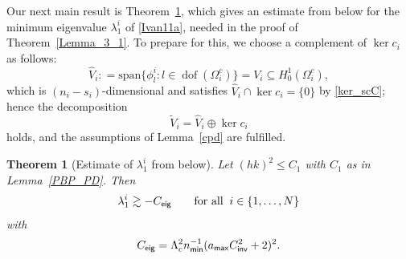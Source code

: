 \documentclass[numbers,webpdf,imaiai]{ima-authoring-template}%
\theoremstyle{thmstyletwo}%
\newtheorem{theorem}{Theorem}[section]
\numberwithin{equation}{section}
\newcommand{\wV}{\widetilde{V}}
\newcommand{\whV}{\widehat{V}}
\newcommand{\Ceig}{C_{\textup{\textsf{eig}}}} %
\newcommand{\Cinvt}{C^2_{\textup{\textsf{inv}}}}
\newcommand{\assign}{\mathrel{\mathop:}=}
\numberwithin{equation}{section}
\DeclareMathOperator{\dof}{dof}
\newcommand{\amax}{a_{\textup{\textsf{max}}}}
\newcommand{\nmin}{n_{\textup{\textsf{min}}}}
\begin{document}
{Our next main result is Theorem~\ref{est_below}, which gives an estimate from below 
for the minimum eigenvalue $\lambda_1^i$ of \eqref{Ivan11a}, needed in 
the proof of Theorem~\ref{Lemma_3_1}.  
To prepare for this, we choose a complement of $\ker c_i$ as follows:
\begin{equation}\label{choice_of_complement}
	\whV_i \assign \mathrm{span} \bigl\{\phi_l^i: l \in \dof(\Omega_i^c)\bigr\} = V_{i} \subseteq H^1_0(\Omega_i^c),
\end{equation}
which is $(n_i-s_i)$-dimensional and satisfies $\whV_i\cap\ker c_i=\{0\}$ by \eqref{ker_scC};
hence the decomposition
\begin{equation} \label{decomp}
	\wV_i = \whV_i \oplus \ker c_i
\end{equation}
holds, and the assumptions of Lemma~\ref{cpd} are fulfilled.


\begin{theorem}[Estimate of $\lambda_1^i$ from below] \label{est_below}
Let $(hk)^2 \le C_1$ with $C_1$ as in Lemma~\ref{PBP_PD}.  Then
\begin{equation} \label{eigest2}
	\lambda_1^i \gtrsim -\Ceig \qquad \text{for all} \;\; i\in\{1,\ldots,N\}
\end{equation} 
with 
\[
	\Ceig = \Lambda_c^{2}\nmin^{-1}(\amax\Cinvt+2)^2.
\]
\end{theorem}

}
\end{document}
